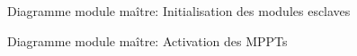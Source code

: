 		\begin{figure}[H]
			\centering
			\caption{Diagramme module maître: Initialisation des modules esclaves}
			\label{fig:diagrammefonctionnelmaitreinitesclave}
		\end{figure}
		
		\begin{figure}[H]
			\centering
			\caption{Diagramme module maître: Activation des MPPTs}
			\label{fig:diagrammefonctionnelactivationmppt}
		\end{figure}
		
